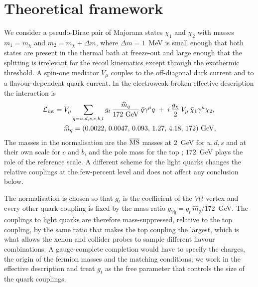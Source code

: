 \section{Theoretical framework}\label{sec:model}

We consider a pseudo-Dirac pair of Majorana states $\chi_1$ and $\chi_2$ with masses $m_1=m_\chi$ and $m_2=m_\chi+\Delta m$, where $\Delta m=1$~MeV is small enough that both states are present in the thermal bath at freeze-out and large enough that the splitting is irrelevant for the recoil kinematics except through the exothermic threshold. A spin-one mediator $V_\mu$ couples to the off-diagonal dark current and to a flavour-dependent quark current. In the electroweak-broken effective description the interaction is
\begin{equation}
\begin{aligned}
\mathcal{L}_{\rm int}={}&V_\mu\sum_{q=u,d,s,c,b,t} g_t\,\frac{\widehat m_q}{172\ \mathrm{GeV}}\,\bar q\gamma^\mu q
\;+\;i\,\frac{g_\chi}{2}\,V_\mu\,\bar\chi_1\gamma^\mu\chi_2,\\
&\widehat m_q=(0.0022,\,0.0047,\,0.093,\,1.27,\,4.18,\,172)\ \mathrm{GeV},
\end{aligned}
\label{eq:lag}
\end{equation}
\noindent The masses in the normalisation are the $\overline{\rm MS}$ masses at $2$~GeV for $u,d,s$ and at their own scale for $c$ and $b$, and the pole mass for the top \cite{PDG}; $172$~GeV plays the role of the reference scale. A different scheme for the light quarks changes the relative couplings at the few-percent level and does not affect any conclusion below.

The normalisation is chosen so that $g_t$ is the coefficient of the $Vt\bar t$ vertex and every other quark coupling is fixed by the mass ratio $g_{Vq}=g_t\,\widehat m_q/172$~GeV. The couplings to light quarks are therefore mass-suppressed, relative to the top coupling, by the same ratio that makes the top coupling the largest, which is what allows the xenon and collider probes to sample different flavour combinations. A gauge-complete completion would have to specify the charges, the origin of the fermion masses and the matching conditions; we work in the effective description and treat $g_t$ as the free parameter that controls the size of the quark couplings.

